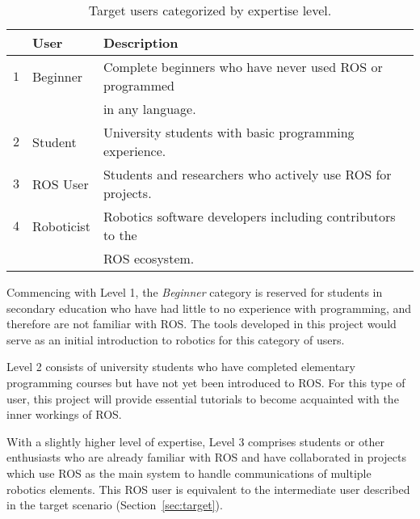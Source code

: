         \begin{table}[htbp]
            \color{textColor}
            \centering	
            \caption{Target users categorized by expertise level.}
                \begin{tabular}{rll}
                    \toprule
                    & \textbf{User}   & \textbf{Description} \\
                    \midrule
                    $1$ & Beginner    & Complete beginners who have never used ROS or programmed \\
                    & & in any language. \\[0.5em]

                    $2$ & Student     & University students with basic programming experience. \\[0.5em]

                    $3$ & ROS User    & Students and researchers who actively use ROS for projects. \\[0.5em]

                    $4$ &  Roboticist & Robotics software developers including contributors to the \\
                    & & ROS ecosystem. \\
                \bottomrule
            \end{tabular}\label{tab:userlevels}
        \end{table}

        Commencing with Level 1, the \textit{Beginner} category is reserved for
        students in secondary education who have had little to no experience with
        programming, and therefore are not familiar with \ac{ROS}. The tools
        developed in this project would serve as an initial introduction to 
        robotics for this category of users.

        Level 2 consists of university students who have completed elementary 
        programming courses but have not yet been introduced to \ac{ROS}. For this
        type of user, this project will provide essential tutorials to become
        acquainted with the inner workings of \ac{ROS}.

        With a slightly higher level of expertise, Level 3 comprises students or
        other enthusiasts who are already familiar with \ac{ROS} and have collaborated
        in projects which use \ac{ROS} as the main system to handle communications
        of multiple robotics elements. This ROS user is equivalent to the intermediate
        user described in the target scenario (Section~\ref{sec:target}).

